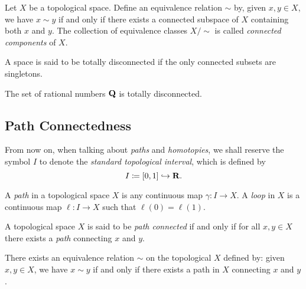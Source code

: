 \begin{definition}
    \label{def:connected-components}
    Let \(X\) be a topological space. Define an equivalence relation \(\sim\) by,
    given \(x, y \in X\), we have \(x \sim y\) if and only if there exists a
    connected subspace of \(X\) containing both \(x\) and \(y\). The collection of
    equivalence classes \(X/{\sim}\) is called \emph{connected components} of \(X\).
\end{definition}

\begin{definition}
    \label{def:totally-disconnected}
    A space is said to be totally disconnected if the only connected subsets are
    singletons.
\end{definition}

\begin{example}
    \label{exp:Q-is-totally-disconnected}
    The set of rational numbers \(\mathbf{Q}\) is totally disconnected.
\end{example}

\subsection{Path Connectedness}

\begin{notation}
    From now on, when talking about \emph{paths} and \emph{homotopies}, we shall
    reserve the symbol \(I\) to denote the \emph{standard topological interval},
    which is defined by
    \[
        I \coloneq [0, 1] \hookrightarrow \mathbf{R}.
    \]
\end{notation}

\begin{definition}
    \label{def:path-loop}
    A \emph{path} in a topological space \(X\) is any continuous map \(\gamma: I \to
    X\). A \emph{loop} in \(X\) is a continuous map \(\ell: I \to X\) such that
    \(\ell(0) = \ell(1)\).
\end{definition}

\begin{definition}
    \label{def:path-connected}
    A topological space \(X\) is said to be \emph{path connected} if and only if
    for all \(x, y \in X\) there exists a \emph{path} connecting \(x\) and \(y\).
\end{definition}

\begin{proposition}
    \label{prop:path-connected-equiv-relation}
    There exists an equivalence relation \(\sim\) on the topological \(X\) defined
    by: given \(x, y \in X\), we have \(x \sim y\) if and only if there exists a
    path in \(X\) connecting \(x\) and \(y\).
\end{proposition}

